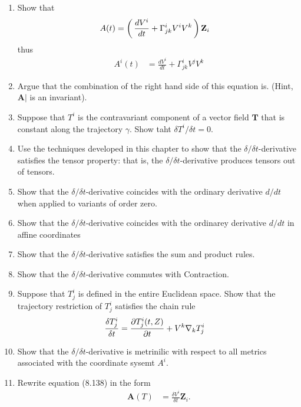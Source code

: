 \documentclass[12pt,a4paper]{report}
\newcommand{\COFF}[3]{\Gamma^{#1}_{{#2}{#3}}}
\newcommand{\VK}[1]{\textbf{#1}}
\begin{document}
\begin{enumerate}[label=\textbf{\arabic*.}]
\item Show that 
\begin{align*}
	A(t) &= \PAREN{\frac{d V^i}{dt} + \COFF{i}{j}{k}V^iV^k}\VK{Z}_i
\end{align*}thus
\begin{align*}
	A^i(t) &= \frac{dV^i}{dt} + \COFF{i}{j}{k} V^jV^k
\end{align*}

\item Argue that the combination of the right hand side of this equation is. (Hint, $\VK{A}|$ is an invariant).

\item Suppose that $T^i$ is the contravariant component of a vector field $\VK{T}$ that is constant along the trajectory $\gamma$.  Show taht $\delta T^i/\delta t = 0$.

\item Use the techniques developed in this chapter to show that the $\delta/\delta t$-derivative satisfies the tensor property: that is, the $\delta/\delta t$-derivative produces tensors out of tensors.

\item Show that the $\delta/\delta t$-derivative coincides with the ordinary derivative $d/dt$ when applied to variants of order zero.

\item Show that the $\delta/\delta t$-derivative coincides with the ordinarey derivative $d/dt$ in affine coordinates

\item Show that the $\delta/\delta t$-derivative satisfies the sum and product rules.

\item Show that the $\delta/\delta t$-derivative commutes with Contraction.

\item Suppose that $T^i_j$ is defined in the entire Euclidean space.  Show that the trajectory restriction of $T^i_j$ satisfies the chain rule
\begin{align*}
	\frac{\delta T^i_j}{\delta t} &= \frac{\partial T^i_j(t,Z)}{\partial t}+V^k\nabla_k T^i_j
\end{align*}

\item Show that the $\delta/\delta t$-derivative is metrinilic with respect to all metrics associated with the coordinate sysemt $A^i$.

\item Rewrite equation (8.138) in the form 
\begin{align*}
	\VK{A}(T) &= \frac{\delta V^i}{\delta t} \VK{Z}_i.
\end{align*}

\end{enumerate}
\end{document}
